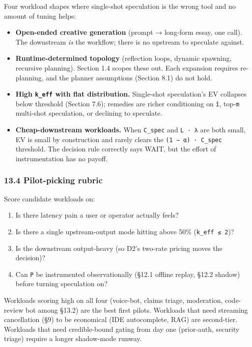 \documentclass[
  11pt,
]{article}
\providecommand{\tightlist}{%
  \setlength{\itemsep}{0pt}\setlength{\parskip}{0pt}}
\begin{document}
Four workload shapes where single-shot speculation is the wrong tool and
no amount of tuning helps:

\begin{itemize}
\tightlist
\item
  \textbf{Open-ended creative generation} (prompt → long-form essay, one
  call). The downstream \emph{is} the workflow; there is no upstream to
  speculate against.
\item
  \textbf{Runtime-determined topology} (reflection loops, dynamic
  spawning, recursive planning). Section 1.4 scopes these out. Each
  expansion requires re-planning, and the planner assumptions (Section
  8.1) do not hold.
\item
  \textbf{High \texttt{k\_eff} with flat distribution.} Single-shot
  speculation's EV collapses below threshold (Section 7.6); remedies are
  richer conditioning on \texttt{î}, top-\texttt{m} multi-shot
  speculation, or declining to speculate.
\item
  \textbf{Cheap-downstream workloads.} When \texttt{C\_spec} and
  \texttt{L\ ·\ λ} are both small, EV is small by construction and
  rarely clears the \texttt{(1\ −\ α)\ ·\ C\_spec} threshold. The
  decision rule correctly says WAIT, but the effort of instrumentation
  has no payoff.
\end{itemize}

\subsubsection{13.4 Pilot-picking rubric}\label{pilot-picking-rubric}

Score candidate workloads on:

\begin{enumerate}
\def\labelenumi{\arabic{enumi}.}
\tightlist
\item
  Is there latency pain a user or operator actually feels?
\item
  Is there a single upstream-output mode hitting above 50\%
  (\texttt{k\_eff\ ≤\ 2})?
\item
  Is the downstream output-heavy (so D2's two-rate pricing moves the
  decision)?
\item
  Can \texttt{P} be instrumented observationally (§12.1 offline replay,
  §12.2 shadow) before turning speculation on?
\end{enumerate}

Workloads scoring high on all four (voice-bot, claims triage,
moderation, code-review bot among §13.2) are the best first pilots.
Workloads that need streaming cancellation (§9) to be economical (IDE
autocomplete, RAG) are second-tier. Workloads that need credible-bound
gating from day one (prior-auth, security triage) require a longer
shadow-mode runway.
\end{document}

